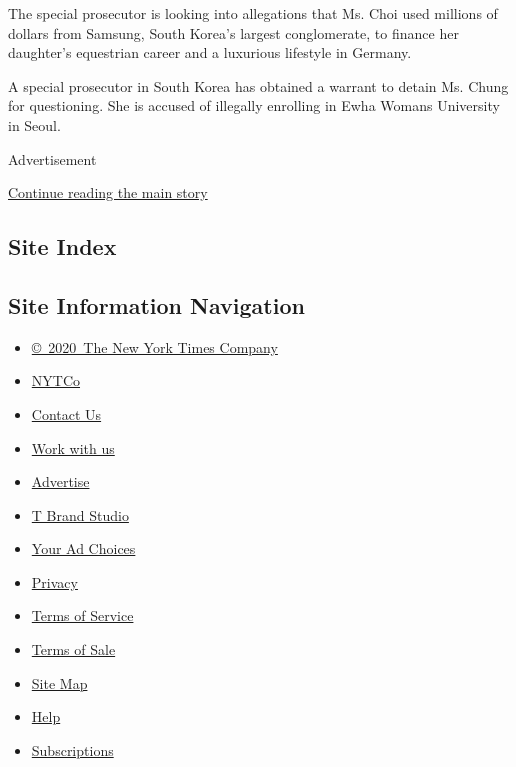 The special prosecutor is looking into allegations that Ms. Choi used
millions of dollars from Samsung, South Korea's largest conglomerate, to
finance her daughter's equestrian career and a luxurious lifestyle in
Germany.

A special prosecutor in South Korea has obtained a warrant to detain Ms.
Chung for questioning. She is accused of illegally enrolling in Ewha
Womans University in Seoul.

Advertisement

\protect\hyperlink{after-bottom}{Continue reading the main story}

\hypertarget{site-index}{%
\subsection{Site Index}\label{site-index}}

\hypertarget{site-information-navigation}{%
\subsection{Site Information
Navigation}\label{site-information-navigation}}

\begin{itemize}
\tightlist
\item
  \href{https://help.nytimes.com/hc/en-us/articles/115014792127-Copyright-notice}{©~2020~The
  New York Times Company}
\end{itemize}

\begin{itemize}
\tightlist
\item
  \href{https://www.nytco.com/}{NYTCo}
\item
  \href{https://help.nytimes.com/hc/en-us/articles/115015385887-Contact-Us}{Contact
  Us}
\item
  \href{https://www.nytco.com/careers/}{Work with us}
\item
  \href{https://nytmediakit.com/}{Advertise}
\item
  \href{http://www.tbrandstudio.com/}{T Brand Studio}
\item
  \href{https://www.nytimes.com/privacy/cookie-policy\#how-do-i-manage-trackers}{Your
  Ad Choices}
\item
  \href{https://www.nytimes.com/privacy}{Privacy}
\item
  \href{https://help.nytimes.com/hc/en-us/articles/115014893428-Terms-of-service}{Terms
  of Service}
\item
  \href{https://help.nytimes.com/hc/en-us/articles/115014893968-Terms-of-sale}{Terms
  of Sale}
\item
  \href{https://spiderbites.nytimes.com}{Site Map}
\item
  \href{https://help.nytimes.com/hc/en-us}{Help}
\item
  \href{https://www.nytimes.com/subscription?campaignId=37WXW}{Subscriptions}
\end{itemize}
